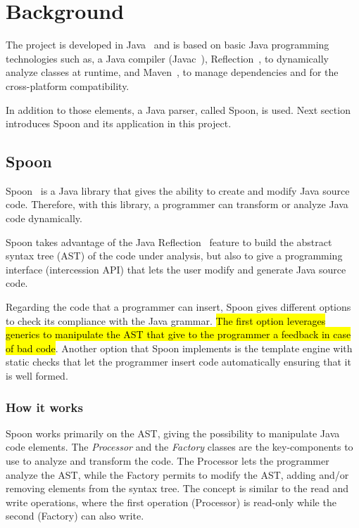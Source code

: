 \chapter{Background}\label{ch:background}
The project is developed in Java~\cite{Arnold:2000:JPL:556709} and is based on basic Java programming technologies such as, a Java compiler (Javac~\cite{javacWiki}), Reflection~\cite{reflect}, to dynamically analyze classes at runtime, and Maven~\cite{bharathan2015apache}, to manage dependencies and for the cross-platform compatibility.

In addition to those elements, a Java parser, called Spoon, is used. Next section introduces Spoon and its application in this project.

\section{Spoon}\label{sec:spoon}
Spoon~\cite{pawlak:hal-01169705} is a Java library that gives the ability to create and modify Java source code. Therefore, with this library, a programmer can transform or analyze Java code dynamically.

Spoon takes advantage of the Java Reflection~\cite{reflect} feature to build the abstract syntax tree (AST) of the code under analysis, but also to give a programming interface (intercession API) that lets the user modify and generate Java source code.


Regarding the code that a programmer can insert, Spoon gives different options to check its compliance with the Java grammar. \hl{The first option leverages generics to manipulate the AST that give to the programmer a feedback in case of bad code}. Another option that Spoon implements is the template engine with static checks that let the programmer insert code automatically ensuring that it is well formed.


\subsection*{How it works}\label{subsec:howSpoon}
Spoon works primarily on the AST, giving the possibility to manipulate Java code elements. The \emph{Processor} and the \emph{Factory} classes are the key-components to use to analyze and transform the code. The Processor lets the programmer analyze the AST, while the Factory permits to modify the AST, adding and/or removing elements from the syntax tree. The concept is similar to the read and write operations, where the first operation (Processor) is read-only while the second (Factory) can also write.

